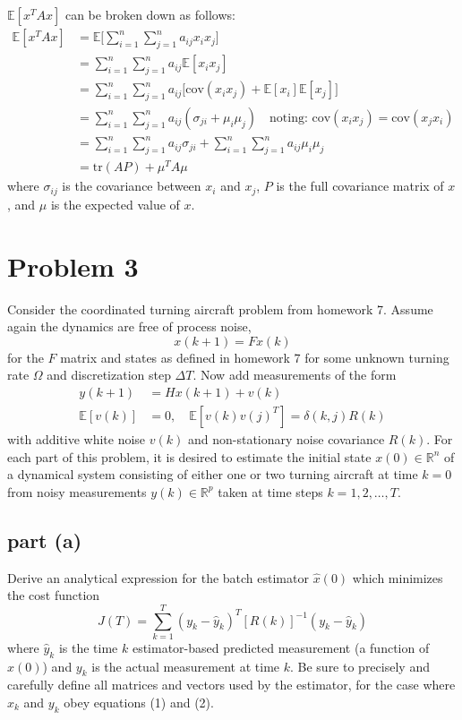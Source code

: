 \documentclass[11pt]{article}
\begin{document}
\subparagraph*{}
$\mathbb{E}[x^TAx]$ can be broken down as follows:
\begin{align*}
	\mathbb{E}[x^TAx] &= \mathbb{E}\Bigg[\sum_{i=1}^n\sum_{j=1}^n a_{ij}x_ix_j\Bigg] \\
	&= \sum_{i=1}^n\sum_{j=1}^na_{ij}\mathbb{E}[x_ix_j]\\
	&= \sum_{i=1}^n\sum_{j=1}^na_{ij}\Bigg[\text{cov}(x_ix_j)+\mathbb{E}[x_i]\mathbb{E}[x_j]\Bigg] \\
	&= \sum_{i=1}^n\sum_{j=1}^n a_{ij}(\sigma_{ji}+\mu_i\mu_j)\quad \text{noting: } \text{cov}(x_ix_j)=\text{cov}(x_jx_i)\\
	&= \sum_{i=1}^n\sum_{j=1}^n a_{ij}\sigma_{ji} + \sum_{i=1}^n\sum_{j=1}^n a_{ij}\mu_i\mu_j \\
	&= \text{tr}(AP) + \mu^TA\mu
\end{align*}
where $\sigma_{ij}$ is the covariance between $x_i$ and $x_j$, $P$ is the full covariance matrix of $x$, and $\mu$ is the expected value of $x$.

\section*{Problem 3}
Consider the coordinated turning aircraft problem from homework 7. Assume again the dynamics are free of process noise,
\begin{equation*}
	x(k+1)=Fx(k)
\end{equation*}
for the $F$ matrix and states as defined in homework 7 for some unknown turning rate $\Omega$ and discretization step $\Delta T$. Now add measurements of the form 
\begin{align*}
	y(k+1)&=Hx(k+1)+v(k) \\
	\mathbb{E}[v(k)] &= 0,\quad \mathbb{E}[v(k)v(j)^T] = \delta(k,j)R(k)
\end{align*}
with additive white noise $v(k)$ and non-stationary noise covariance $R(k)$. For each part of this problem, it is desired to estimate the initial state $x(0)\in\mathbb{R}^n$ of a dynamical system consisting of either one or two turning aircraft at time $k=0$ from noisy measurements $y(k)\in\mathbb{R}^p$ taken at time steps $k=1,2,\dots,T$.

\subsection*{part (a)}
Derive an analytical expression for the batch estimator $\hat{x}(0)$ which minimizes the cost function
\begin{equation*}
	J(T)=\sum_{k=1}^T(y_k-\hat{y}_k)^T[R(k)]^{-1}(y_k-\hat{y}_k)
\end{equation*}
where $\hat{y}_k$ is the time $k$ estimator-based predicted measurement (a function of $\hat{x}(0)$) and $y_k$ is the actual measurement at time $k$. Be sure to precisely and carefully define all matrices and vectors used by the estimator, for the case where $x_k$ and $y_k$ obey equations (1) and (2).
\end{document}
